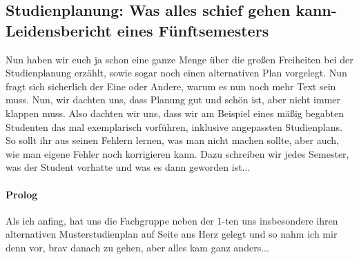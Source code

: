 \subsection{Studienplanung: Was alles schief gehen kann-
  Leidensbericht eines Fünftsemesters}
Nun haben wir euch ja schon eine ganze Menge über die großen
Freiheiten bei der Studienplanung erzählt, sowie sogar noch einen
alternativen Plan vorgelegt. Nun fragt sich sicherlich der Eine oder
Andere, warum es nun noch mehr Text sein muss. Nun, wir dachten uns,
dass Planung gut und schön ist, aber nicht immer klappen muss. Also
dachten wir uns, dass wir am Beispiel eines mäßig begabten Studenten
das mal exemplarisch vorführen, inklusive angepassten Studienplans. So
sollt ihr aus seinen Fehlern lernen, was man nicht machen sollte, aber
auch, wie man eigene Fehler noch korrigieren kann. Dazu schreiben wir
jedes Semester, was der Student vorhatte und was es dann geworden ist...

\paragraph{Prolog}
Als ich anfing, hat uns die Fachgruppe neben der 1-ten uns
insbesondere ihren alternativen Musterstudienplan auf Seite 
\pageref{studienplan_neu}
ans Herz gelegt und
so nahm ich mir denn vor, brav danach zu gehen, aber alles kam ganz
anders...
